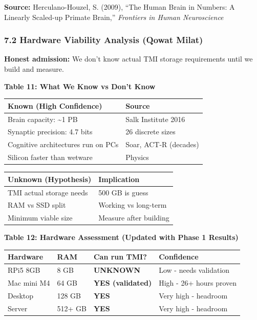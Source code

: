 \documentclass[
]{article}
\begin{document}
\textbf{Source:} Herculano-Houzel, S. (2009), ``The Human Brain in
Numbers: A Linearly Scaled-up Primate Brain,'' \emph{Frontiers in Human
Neuroscience}

\hypertarget{hardware-viability-analysis-qowat-milat}{%
\subsubsection{7.2 Hardware Viability Analysis (Qowat
Milat)}\label{hardware-viability-analysis-qowat-milat}}

\textbf{Honest admission:} We don't know actual TMI storage requirements
until we build and measure.

\textbf{Table 11: What We Know vs Don't Know}

\begin{longtable}[]{@{}ll@{}}
\toprule\noalign{}
Known (High Confidence) & Source \\
\midrule\noalign{}
\endhead
\bottomrule\noalign{}
\endlastfoot
Brain capacity: \textasciitilde1 PB & Salk Institute 2016 \\
Synaptic precision: 4.7 bits & 26 discrete sizes \\
Cognitive architectures run on PCs & Soar, ACT-R (decades) \\
Silicon faster than wetware & Physics \\
\end{longtable}

\begin{longtable}[]{@{}ll@{}}
\toprule\noalign{}
Unknown (Hypothesis) & Implication \\
\midrule\noalign{}
\endhead
\bottomrule\noalign{}
\endlastfoot
TMI actual storage needs & 500 GB is guess \\
RAM vs SSD split & Working vs long-term \\
Minimum viable size & Measure after building \\
\end{longtable}

\textbf{Table 12: Hardware Assessment (Updated with Phase 1 Results)}

\begin{longtable}[]{@{}llll@{}}
\toprule\noalign{}
Hardware & RAM & Can run TMI? & Confidence \\
\midrule\noalign{}
\endhead
\bottomrule\noalign{}
\endlastfoot
RPi5 8GB & 8 GB & \textbf{UNKNOWN} & Low - needs validation \\
Mac mini M4 & 64 GB & \textbf{YES (validated)} & High - 26+ hours
proven \\
Desktop & 128 GB & \textbf{YES} & Very high - headroom \\
Server & 512+ GB & \textbf{YES} & Very high - headroom \\
\end{longtable}
\end{document}
